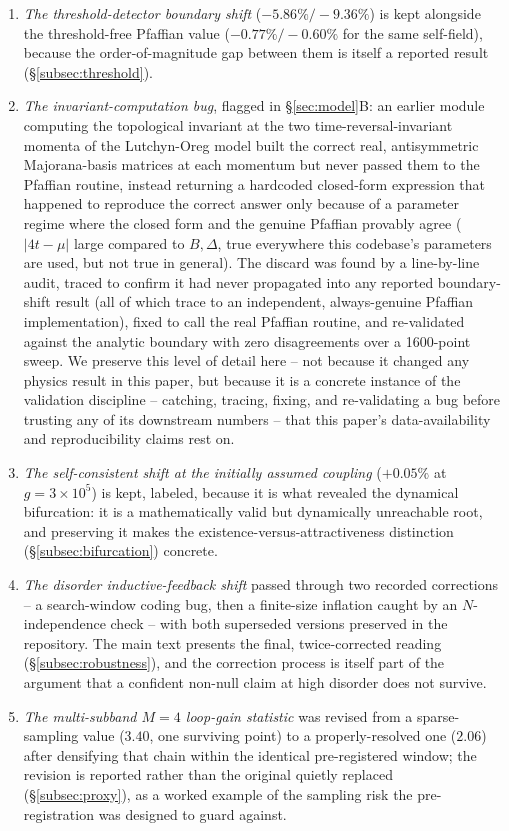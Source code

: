 \documentclass[aps,physrev,reprint,superscriptaddress,amsmath,amssymb,floatfix]{revtex4-2}
\begin{document}
\begin{enumerate}
\item \emph{The threshold-detector boundary shift} ($-5.86\%/-9.36\%$) is
kept alongside the threshold-free Pfaffian value ($-0.77\%/-0.60\%$ for the
same self-field), because the order-of-magnitude gap between them is itself
a reported result (\S\ref{subsec:threshold}).

\item \emph{The invariant-computation bug}, flagged in \S\ref{sec:model}B: an
earlier module computing the topological invariant at the two
time-reversal-invariant momenta of the Lutchyn-Oreg model built the
correct real, antisymmetric Majorana-basis matrices at each momentum but
never passed them to the Pfaffian routine, instead returning a hardcoded
closed-form expression that happened to reproduce the correct answer only
because of a parameter regime where the closed form and the genuine
Pfaffian provably agree ($|4t-\mu|$ large compared to $B,\Delta$, true
everywhere this codebase's parameters are used, but not true in general).
The discard was found by a line-by-line audit, traced to confirm it had
never propagated into any reported boundary-shift result (all of which
trace to an independent, always-genuine Pfaffian implementation), fixed to
call the real Pfaffian routine, and re-validated against the analytic
boundary with zero disagreements over a 1600-point sweep. We preserve this
level of detail here -- not because it changed any physics result in this
paper, but because it is a concrete instance of the validation discipline
-- catching, tracing, fixing, and re-validating a bug before trusting any
of its downstream numbers -- that this paper's data-availability and
reproducibility claims rest on.

\item \emph{The self-consistent shift at the initially assumed coupling}
($+0.05\%$ at $g=3\times10^5$) is kept, labeled, because it is what revealed
the dynamical bifurcation: it is a mathematically valid but
dynamically unreachable root, and preserving it makes the
existence-versus-attractiveness distinction (\S\ref{subsec:bifurcation})
concrete.

\item \emph{The disorder inductive-feedback shift} passed through two
recorded corrections -- a search-window coding bug, then a finite-size
inflation caught by an $N$-independence check -- with both superseded
versions preserved in the repository. The main text presents the final,
twice-corrected reading (\S\ref{subsec:robustness}), and the correction process
is itself part of the argument that a confident non-null claim at high
disorder does not survive.

\item \emph{The multi-subband $M=4$ loop-gain statistic} was revised from a
sparse-sampling value ($3.40$, one surviving point) to a properly-resolved
one ($2.06$) after densifying that chain within the identical pre-registered
window; the revision is reported rather than the original quietly replaced
(\S\ref{subsec:proxy}), as a worked example of the sampling risk the
pre-registration was designed to guard against.
\end{enumerate}
\end{document}
